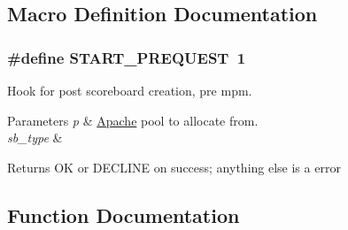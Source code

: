 \subsection{Macro Definition Documentation}
\subsubsection[{\texorpdfstring{S\+T\+A\+R\+T\+\_\+\+P\+R\+E\+Q\+U\+E\+ST}{START_PREQUEST}}]{\setlength{\rightskip}{0pt plus 5cm}\#define S\+T\+A\+R\+T\+\_\+\+P\+R\+E\+Q\+U\+E\+ST~1}\hypertarget{group__hooks_ga2f70b8d11ee2114ee670e7accfe88d72}{}\label{group__hooks_ga2f70b8d11ee2114ee670e7accfe88d72}
Hook for post scoreboard creation, pre mpm. 
\begin{DoxyParams}{Parameters}
{\em p} & \hyperlink{namespaceApache}{Apache} pool to allocate from. \\
\hline
{\em sb\+\_\+type} & \\
\hline
\end{DoxyParams}
\begin{DoxyReturn}{Returns}
OK or D\+E\+C\+L\+I\+NE on success; anything else is a error 
\end{DoxyReturn}


\subsection{Function Documentation}
